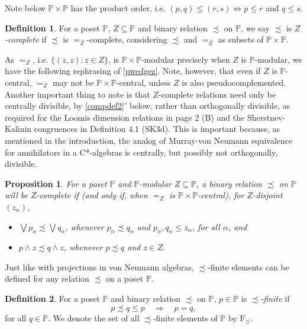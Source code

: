\documentclass{amsart}
\newtheorem{prp}[prp]{Proposition}
\theoremstyle{definition}
\newtheorem{dfn}[dfn]{Definition}
\numberwithin{equation}{section}
\begin{document}
Note below $\mathbb{P}\times\mathbb{P}$ has the product order, i.e. $(p,q)\leq(r,s)\Leftrightarrow p\leq r$ and $q\leq s$.

\begin{dfn}
For a poset $\mathbb{P}$, $Z\subseteq\mathbb{P}$ and binary relation $\precsim$ on $\mathbb{P}$, we say $\precsim$ is \emph{$Z$-complete} if $\precsim$ is $=_Z$-complete, considering $\precsim$ and $=_Z$ as subsets of $\mathbb{P}\times\mathbb{P}$.
\end{dfn}

As $=_Z$, i.e. $\{(z,z):z\in Z\}$, is $\mathbb{P}\times\mathbb{P}$-modular precisely when $Z$ is $\mathbb{P}$-modular, we have the following rephrasing of \autoref{pwedgez}.  Note, however, that even if $Z$ is $\mathbb{P}$-central, $=_Z$ may not be $\mathbb{P}\times\mathbb{P}$-central, unless $Z$ is also pseudocomplemented.  Another important thing to note is that $Z$-complete relations need only be centrally divisible, by \eqref{compdef2}$'$ below, rather than orthogonally divisible, as required for the Loomis dimension relations in \cite{Loomis1955} page 2 (B) and the Sherstnev-Kalinin congruences in \cite{FoulisPulmannova2013} Definition 4.1 (SK3d).  This is important because, as mentioned in the introduction, the analog of Murray-von Neumann equivalence for annihilators in a C*-algebras is centrally, but possibly not orthogonally, divisible.

\begin{prp}\label{pwedgezrel}
For a poset $\mathbb{P}$ and $\mathbb{P}$-modular $Z\subseteq\mathbb{P}$, a binary relation $\precsim$ on $\mathbb{P}$ will be $Z$-complete if (and only if, when $=_Z$ is $\mathbb{P}\times\mathbb{P}$-central), for $Z$-disjoint $(z_\alpha)$,
\begin{itemize}
\item[\eqref{compdef1}] $\bigvee p_\alpha\precsim\bigvee q_\alpha$, whenever $p_\alpha\precsim q_\alpha$ and $p_\alpha,q_\alpha\leq z_\alpha$, for all $\alpha$, and
\item[\eqref{compdef2}$'$] $p\wedge z\precsim q\wedge z$, whenever $p\precsim q$ and $z\in Z$.
\end{itemize}
\end{prp}

Just like with projections in von Neumann algebras, $\precsim$-finite elements can be defined for any relation $\precsim$ on a poset $\mathbb{P}$.

\begin{dfn}\label{findef}
For a poset $\mathbb{P}$ and binary relation $\precsim$ on $\mathbb{P}$, $p\in\mathbb{P}$ is \emph{$\precsim$-finite} if \[p\precsim q\leq p\quad\Rightarrow\quad p=q,\] for all $q\in\mathbb{P}$.  We denote the set of all $\precsim$-finite elements of $\mathbb{P}$ by $\mathrm{F}_\precsim$.
\end{dfn}
\end{document}

